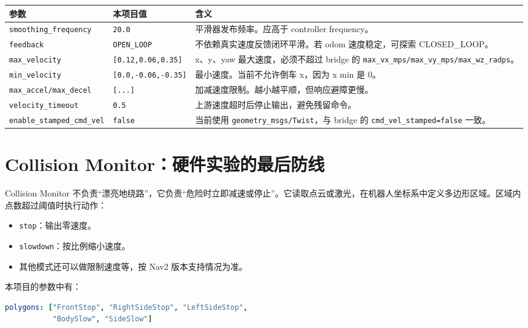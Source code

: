 \documentclass[UTF8,11pt,a4paper,openany]{ctexrep}
\newcommand{\code}[1]{\nolinkurl{#1}}
\newcommand{\param}[1]{\nolinkurl{#1}}
\begin{document}
\begin{longtable}{L{0.28\textwidth}L{0.20\textwidth}L{0.42\textwidth}}
\toprule
参数 & 本项目值 & 含义 \\
\midrule
\param{smoothing_frequency} & \code{20.0} & 平滑器发布频率。应高于 controller frequency。 \\
\param{feedback} & \code{OPEN_LOOP} & 不依赖真实速度反馈闭环平滑。若 odom 速度稳定，可探索 CLOSED\_LOOP。 \\
\param{max_velocity} & \code{[0.12,0.06,0.35]} & x、y、yaw 最大速度，必须不超过 bridge 的 \param{max_vx_mps/max_vy_mps/max_wz_radps}。 \\
\param{min_velocity} & \code{[0.0,-0.06,-0.35]} & 最小速度。当前不允许倒车 x，因为 x min 是 0。 \\
\param{max_accel/max_decel} & \code{[...]} & 加减速度限制。越小越平顺，但响应避障更慢。 \\
\param{velocity_timeout} & \code{0.5} & 上游速度超时后停止输出，避免残留命令。 \\
\param{enable_stamped_cmd_vel} & \code{false} & 当前使用 \code{geometry_msgs/Twist}，与 bridge 的 \param{cmd_vel_stamped=false} 一致。 \\
\bottomrule
\end{longtable}

\section{Collision Monitor：硬件实验的最后防线}

Collision Monitor 不负责“漂亮地绕路”，它负责“危险时立即减速或停止”。它读取点云或激光，在机器人坐标系中定义多边形区域。区域内点数超过阈值时执行动作：

\begin{itemize}
  \item \code{stop}：输出零速度。
  \item \code{slowdown}：按比例缩小速度。
  \item 其他模式还可以做限制速度等，按 Nav2 版本支持情况为准。
\end{itemize}

本项目的参数中有：

\begin{lstlisting}[language=yaml]
polygons: ["FrontStop", "RightSideStop", "LeftSideStop",
           "BodySlow", "SideSlow"]
\end{lstlisting}
\end{document}
